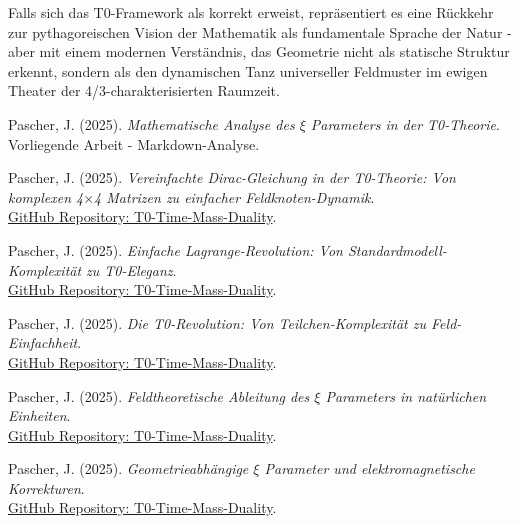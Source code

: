 \documentclass[12pt,a4paper]{article}
\newcommand{\mytimes}{\ensuremath{\times}}
\begin{document}
	Falls sich das T0-Framework als korrekt erweist, repräsentiert es eine Rückkehr zur pythagoreischen Vision der Mathematik als fundamentale Sprache der Natur - aber mit einem modernen Verständnis, das Geometrie nicht als statische Struktur erkennt, sondern als den dynamischen Tanz universeller Feldmuster im ewigen Theater der 4/3-charakterisierten Raumzeit.
	
	\begin{thebibliography}{99}
		
		Pascher, J. (2025). \textit{Mathematische Analyse des $\xi$ Parameters in der T0-Theorie}. \\
		Vorliegende Arbeit - Markdown-Analyse.
		
		Pascher, J. (2025). \textit{Vereinfachte Dirac-Gleichung in der T0-Theorie: Von komplexen 4$\mytimes$4 Matrizen zu einfacher Feldknoten-Dynamik}. \\
		\href{https://github.com/jpascher/T0-Time-Mass-Duality/blob/main/2/pdf/diracVereinfachtEn.pdf}{GitHub Repository: T0-Time-Mass-Duality}.
		
		Pascher, J. (2025). \textit{Einfache Lagrange-Revolution: Von Standardmodell-Komplexität zu T0-Eleganz}. \\
		\href{https://github.com/jpascher/T0-Time-Mass-Duality/blob/main/2/pdf/LagrandianVergleichEn.pdf}{GitHub Repository: T0-Time-Mass-Duality}.
		
		Pascher, J. (2025). \textit{Die T0-Revolution: Von Teilchen-Komplexität zu Feld-Einfachheit}. \\
		\href{https://github.com/jpascher/T0-Time-Mass-Duality/blob/main/2/pdf/systemEn.pdf}{GitHub Repository: T0-Time-Mass-Duality}.
		
		Pascher, J. (2025). \textit{Feldtheoretische Ableitung des $\xi$ Parameters in natürlichen Einheiten}. \\
		\href{https://github.com/jpascher/T0-Time-Mass-Duality/blob/main/2/pdf/DerivationVonBetaEn.pdf}{GitHub Repository: T0-Time-Mass-Duality}.
		
		Pascher, J. (2025). \textit{Geometrieabhängige $\xi$ Parameter und elektromagnetische Korrekturen}. \\
		\href{https://github.com/jpascher/T0-Time-Mass-Duality/blob/main/2/pdf/Ho\_EnergieEn.pdf}{GitHub Repository: T0-Time-Mass-Duality}.
		

\end{thebibliography}
\end{document}
